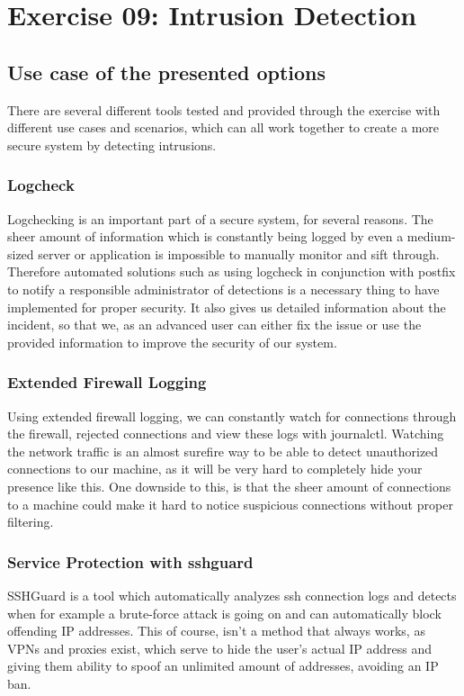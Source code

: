 \section{Exercise 09: Intrusion Detection}
\subsection{Use case of the presented options}
There are several different tools tested and provided through the exercise with different use cases and scenarios, which can all work together to create a more secure system by detecting intrusions.
\subsubsection{Logcheck}
Logchecking is an important part of a secure system, for several reasons. The sheer amount of information which is constantly being logged by even a medium-sized server or application is impossible to manually monitor and sift through. Therefore automated solutions such as using logcheck in conjunction with postfix to notify a responsible administrator of detections is a necessary thing to have implemented for proper security. It also gives us detailed information about the incident, so that we, as an advanced user can either fix the issue or use the provided information to improve the security of our system.

\subsubsection{Extended Firewall Logging}
Using extended firewall logging, we can constantly watch for connections through the firewall, rejected connections and view these logs with journalctl. Watching the network traffic is an almost surefire way to be able to detect unauthorized connections to our machine, as it will be very hard to completely hide your presence like this. One downside to this, is that the sheer amount of connections to a machine could make it hard to notice suspicious connections without proper filtering.

\subsubsection{Service Protection with sshguard}
SSHGuard is a tool which automatically analyzes ssh connection logs and detects when for example a brute-force attack is going on and can automatically block offending IP addresses. This of course, isn't a method that always works, as VPNs and proxies exist, which serve to hide the user's actual IP address and giving them ability to spoof an unlimited amount of addresses, avoiding an IP ban.

